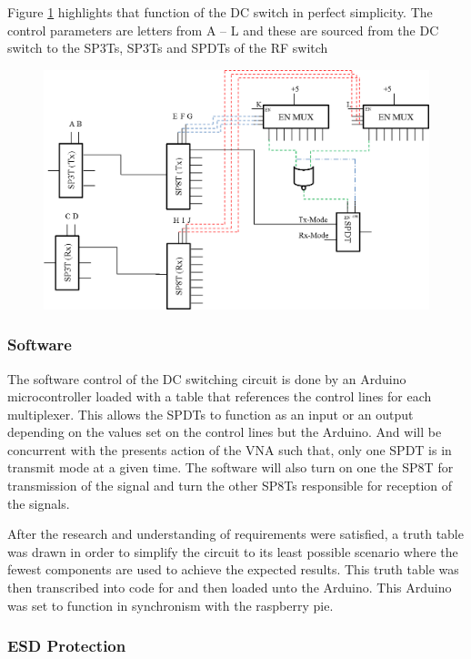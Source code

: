 Figure \ref{fig:eddie_fig1} highlights that function of the DC switch in perfect simplicity. The control parameters are letters from A – L and these are sourced from the DC switch to the SP3Ts, SP3Ts and SPDTs of the RF switch

\begin{figure}[h]
	\begin{center}
		\includegraphics[width=4.5in]{./images/eddie_image1.png}
		\caption{}
		\label{fig:eddie_fig1}
	\end{center}
\end{figure}


\subsubsection{Software}

The software control of the DC switching circuit is done by an Arduino microcontroller loaded with a table that references the control lines for each multiplexer. This allows the SPDTs to function as an input or an output depending on the values set on the control lines but the Arduino. And will be concurrent with the presents action of the VNA such that, only one SPDT is in transmit mode at a given time. The software will also turn on one the SP8T for transmission of the signal and turn the other SP8Ts responsible for reception of the signals. 

After the research and understanding of requirements were satisfied, a truth table was drawn in order to simplify the circuit to its least possible scenario where the fewest components are used to achieve the expected results. This truth table was then transcribed into code for and then loaded unto the Arduino. This Arduino was set to function in synchronism with the raspberry pie.

\subsubsection{ESD Protection}

